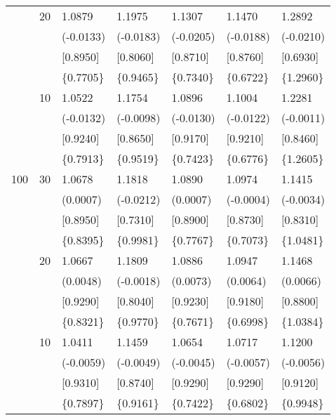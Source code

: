 \begin{table}[H]
{\begin{tabular}{c c | C{2.48cm} | C{2.48cm} | C{2.48cm} | C{2.48cm} | C{2.48cm} }
			&20&1.0879&1.1975&1.1307&1.1470&1.2892\\
			&&(-0.0133)&(-0.0183)&(-0.0205)&(-0.0188)&(-0.0210)\\
			&&[0.8950]&[0.8060]&[0.8710]&[0.8760]&[0.6930]\\
			&&\{0.7705\}&\{0.9465\}&\{0.7340\}&\{0.6722\}&\{1.2960\}\\
			&10&1.0522&1.1754&1.0896&1.1004&1.2281\\
			&&(-0.0132)&(-0.0098)&(-0.0130)&(-0.0122)&(-0.0011)\\
			&&[0.9240]&[0.8650]&[0.9170]&[0.9210]&[0.8460]\\
			&&\{0.7913\}&\{0.9519\}&\{0.7423\}&\{0.6776\}&\{1.2605\}\\
			\cmidrule(lr){1-7}
			100&30&1.0678&1.1818&1.0890&1.0974&1.1415\\
			&&(0.0007)&(-0.0212)&(0.0007)&(-0.0004)&(-0.0034)\\
			&&[0.8950]&[0.7310]&[0.8900]&[0.8730]&[0.8310]\\
			&&\{0.8395\}&\{0.9981\}&\{0.7767\}&\{0.7073\}&\{1.0481\}\\
			&20&1.0667&1.1809&1.0886&1.0947&1.1468\\
			&&(0.0048)&(-0.0018)&(0.0073)&(0.0064)&(0.0066)\\
			&&[0.9290]&[0.8040]&[0.9230]&[0.9180]&[0.8800]\\
			&&\{0.8321\}&\{0.9770\}&\{0.7671\}&\{0.6998\}&\{1.0384\}\\
			&10&1.0411&1.1459&1.0654&1.0717&1.1200\\
			&&(-0.0059)&(-0.0049)&(-0.0045)&(-0.0057)&(-0.0056)\\
			&&[0.9310]&[0.8740]&[0.9290]&[0.9290]&[0.9120]\\
			&&\{0.7897\}&\{0.9161\}&\{0.7422\}&\{0.6802\}&\{0.9948\}\\
			\bottomrule[1.5pt]
	\end{tabular}}
	\label{table:table S.3}
\end{table}

